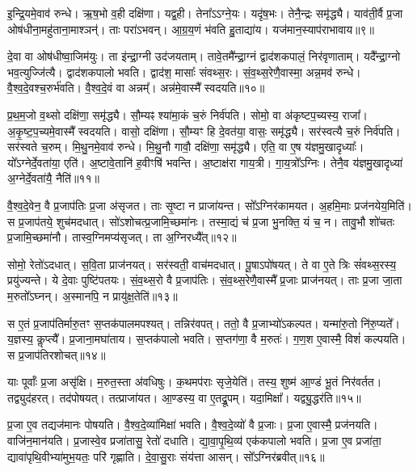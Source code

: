 इ॒न्द्रि॒यमे॒वाव॑ रुन्धे।
ऋ॒ष॒भो व॒ही दक्षि॑णा।
यद्व॒ही।
तेना᳚ऽऽग्ने॒यः।
यदृ॑ष॒भः।
तेनै॒न्द्रः समृ॑द्ध्यै।
याव॑ती॒र्वै प्र॒जा ओष॑धीना॒महु॑ताना॒माश्ञन्॑।
ताः परा॑\-ऽभवन्।
आ॒ग्र॒य॒णं भ॑वति हु॒ताद्या॑य।
यज॑मान॒स्याप॑रा\-भावाय॥९॥

दे॒वा वा ओष॑धीष्वा॒जिम॑युः।
ता इ॑न्द्रा॒ग्नी उद॑जयताम्।
तावे॒तमै᳚न्द्रा॒ग्नं द्वाद॑शकपालं॒ निर॑वृणाताम्।
यदै᳚न्द्रा॒ग्नो भव॒त्युज्जि॑त्यै।
द्वाद॑शकपालो भवति।
द्वाद॑श॒ मासाः᳚ संवथ्स॒रः।
सं॒व॒थ्स॒रेणै॒वास्मा॒ अन्न॒मव॑ रुन्धे।
वै॒श्व॒दे॒व\-श्च॒रुर्भ॑वति।
वै॒श्व॒दे॒वं वा अन्नम्᳚।
अन्न॑मे॒वास्मै᳚ स्वदयति॥१०॥

प्र॒थ॒म॒जो व॒थ्सो दक्षि॑णा॒ समृ॑द्ध्यै।
सौ॒म्यꣴ श्या॑मा॒कं च॒रुं निर्व॑पति।
सोमो॒ वा अ॑कृष्टप॒च्यस्य॒ राजा᳚।
अ॒कृ॒ष्ट॒प॒च्यमे॒वास्मै᳚ स्वदयति।
वासो॒ दक्षि॑णा।
सौ॒म्यꣳ हि दे॒वत॑या॒ वासः॒ समृ॑द्ध्यै।
सर॑स्वत्यै च॒रुं निर्व॑पति।
सर॑स्वते च॒रुम्।
मि॒थु॒नमे॒वाव॑ रुन्धे।
मि॒थु॒नौ गावौ॒ दक्षि॑णा॒ समृ॑द्ध्यै।
एति॒ वा ए॒ष य॑ज्ञमु॒खादृध्याः᳚।
यो᳚ऽग्नेर्दे॒वता॑या॒ एति॑।
अ॒ष्टावे॒तानि॑ ह॒वीꣳषि॑ भवन्ति।
अ॒ष्टाक्ष॑रा गाय॒त्री।
गा॒य॒त्रो᳚\-ऽग्निः।
तेनै॒व य॑ज्ञमु॒खादृध्या॑ अ॒ग्नेर्दे॒वता॑यै॒ नैति॑॥११॥

वै॒श्व॒दे॒वेन॒ वै प्र॒जा\-प॑तिः प्र॒जा अ॑\-सृजत।
ताः सृ॒ष्टा न प्राजा॑यन्त।
सो᳚ऽग्निर॑कामयत।
अ॒हमि॒माः प्रज॑नयेय॒मिति॑।
स प्र॒जा\-प॑तये॒ शुच॑मदधात्।
सो॑ऽशोचत्प्र॒जामि॒च्छमा॑नः।
तस्मा॒द्यं च॑ प्र॒जा भु॒नक्ति॒ यं च॒ न।
तावु॒भौ शो॑चतः प्र॒जामि॒च्छमा॑नौ।
तास्व॒ग्निमप्य॑\-सृजत्।
ता अ॒ग्निरध्यै᳚त्॥१२॥

सोमो॒ रेतो॑\-ऽदधात्।
स॒वि॒ता प्राज॑नयत्।
सर॑स्वती॒ वाच॑मदधात्।
पू॒षा\-ऽपो॑षयत्।
ते वा ए॒ते त्रिः सं॑वथ्स॒रस्य॒ प्रयु॑ज्यन्ते।
ये दे॒वाः पुष्टि॑पतयः।
सं॒व॒थ्स॒रो वै प्र॒जा\-प॑तिः।
सं॒व॒थ्स॒रेणै॒वास्मै᳚ प्र॒जाः प्राज॑नयत्।
ताः प्र॒जा जा॒ता म॒रुतो᳚\-ऽघ्नन्।
अ॒स्मानपि॒ न प्रायु॑क्ष॒तेति॑॥१३॥

स ए॒तं प्र॒जा\-प॑तिर्मारु॒तꣳ स॒प्तक॑पालमपश्यत्।
तन्निर॑वपत्।
ततो॒ वै प्र॒जाभ्यो॑\-ऽकल्पत।
यन्मा॑रु॒तो नि॑रु॒प्यते᳚।
य॒ज्ञस्य॒ कॢप्त्यै᳚।
प्र॒जाना॒मघा॑ताय।
स॒प्तक॑पालो भवति।
स॒प्तग॑णा॒ वै म॒रुतः॑।
ग॒ण॒श ए॒वास्मै॒ विशं॑ कल्पयति।
स प्र॒जा\-प॑तिरशोचत्॥१४॥

याः पूर्वाः᳚ प्र॒जा असृ॑क्षि।
म॒रुत॒स्ता अ॑वधिषुः।
क॒थमप॑राः सृजे॒येति॑।
तस्य॒ शुष्म॑ आ॒ण्डं भू॒तं निर॑वर्तत।
तद्व्युद॑हरत्।
तद॑पोषयत्।
तत्प्राजा॑यत।
आ॒ण्डस्य॒ वा ए॒तद्रू॒पम्।
यदा॒मिक्षा᳚।
यद्व्यु॒द्धर॑ति॥१५॥

प्र॒जा ए॒व तद्यज॑मानः पोषयति।
वै॒श्व॒दे॒व्या॑मिक्षा॑ भवति।
वै॒श्व॒दे॒व्यो॑ वै प्र॒जाः।
प्र॒जा ए॒वास्मै॒ प्रज॑नयति।
वाजि॑न॒मान॑यति।
प्र॒जास्वे॒व प्रजा॑तासु॒ रेतो॑ दधाति।
द्या॒वा॒पृ॒थि॒व्य॑ एक॑कपालो भवति।
प्र॒जा ए॒व प्रजा॑ता॒ द्यावा॑पृथि॒वीभ्या॑मुभ॒यतः॒ परि॑ गृह्णाति।
दे॒वा॒सु॒राः संय॑त्ता आसन्।
सो᳚ऽग्निर॑ब्रवीत्॥१६॥

